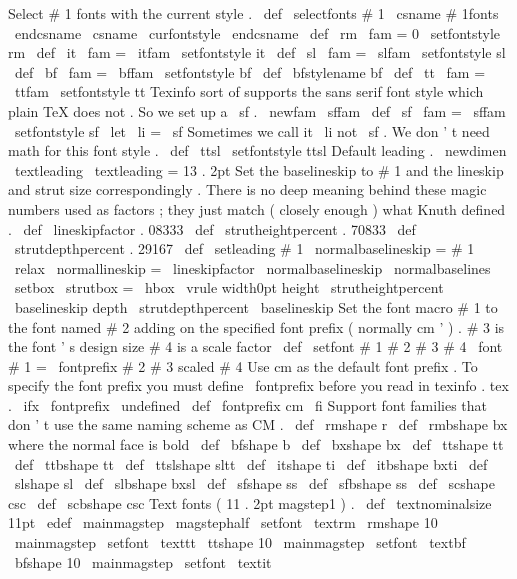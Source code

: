 %
Select
#
1
fonts
with
the
current
style
.
%
\
def
\
selectfonts
#
1
{
\
csname
#
1fonts
\
endcsname
\
csname
\
curfontstyle
\
endcsname
}
\
def
\
rm
{
\
fam
=
0
\
setfontstyle
{
rm
}
}
\
def
\
it
{
\
fam
=
\
itfam
\
setfontstyle
{
it
}
}
\
def
\
sl
{
\
fam
=
\
slfam
\
setfontstyle
{
sl
}
}
\
def
\
bf
{
\
fam
=
\
bffam
\
setfontstyle
{
bf
}
}
\
def
\
bfstylename
{
bf
}
\
def
\
tt
{
\
fam
=
\
ttfam
\
setfontstyle
{
tt
}
}
%
Texinfo
sort
of
supports
the
sans
serif
font
style
which
plain
TeX
does
not
.
%
So
we
set
up
a
\
sf
.
\
newfam
\
sffam
\
def
\
sf
{
\
fam
=
\
sffam
\
setfontstyle
{
sf
}
}
\
let
\
li
=
\
sf
%
Sometimes
we
call
it
\
li
not
\
sf
.
%
We
don
'
t
need
math
for
this
font
style
.
\
def
\
ttsl
{
\
setfontstyle
{
ttsl
}
}
%
Default
leading
.
\
newdimen
\
textleading
\
textleading
=
13
.
2pt
%
Set
the
baselineskip
to
#
1
and
the
lineskip
and
strut
size
%
correspondingly
.
There
is
no
deep
meaning
behind
these
magic
numbers
%
used
as
factors
;
they
just
match
(
closely
enough
)
what
Knuth
defined
.
%
\
def
\
lineskipfactor
{
.
08333
}
\
def
\
strutheightpercent
{
.
70833
}
\
def
\
strutdepthpercent
{
.
29167
}
%
\
def
\
setleading
#
1
{
%
\
normalbaselineskip
=
#
1
\
relax
\
normallineskip
=
\
lineskipfactor
\
normalbaselineskip
\
normalbaselines
\
setbox
\
strutbox
=
\
hbox
{
%
\
vrule
width0pt
height
\
strutheightpercent
\
baselineskip
depth
\
strutdepthpercent
\
baselineskip
}
%
}
%
Set
the
font
macro
#
1
to
the
font
named
#
2
adding
on
the
%
specified
font
prefix
(
normally
cm
'
)
.
%
#
3
is
the
font
'
s
design
size
#
4
is
a
scale
factor
\
def
\
setfont
#
1
#
2
#
3
#
4
{
\
font
#
1
=
\
fontprefix
#
2
#
3
scaled
#
4
}
%
Use
cm
as
the
default
font
prefix
.
%
To
specify
the
font
prefix
you
must
define
\
fontprefix
%
before
you
read
in
texinfo
.
tex
.
\
ifx
\
fontprefix
\
undefined
\
def
\
fontprefix
{
cm
}
\
fi
%
Support
font
families
that
don
'
t
use
the
same
naming
scheme
as
CM
.
\
def
\
rmshape
{
r
}
\
def
\
rmbshape
{
bx
}
%
where
the
normal
face
is
bold
\
def
\
bfshape
{
b
}
\
def
\
bxshape
{
bx
}
\
def
\
ttshape
{
tt
}
\
def
\
ttbshape
{
tt
}
\
def
\
ttslshape
{
sltt
}
\
def
\
itshape
{
ti
}
\
def
\
itbshape
{
bxti
}
\
def
\
slshape
{
sl
}
\
def
\
slbshape
{
bxsl
}
\
def
\
sfshape
{
ss
}
\
def
\
sfbshape
{
ss
}
\
def
\
scshape
{
csc
}
\
def
\
scbshape
{
csc
}
%
Text
fonts
(
11
.
2pt
magstep1
)
.
\
def
\
textnominalsize
{
11pt
}
\
edef
\
mainmagstep
{
\
magstephalf
}
\
setfont
\
textrm
\
rmshape
{
10
}
{
\
mainmagstep
}
\
setfont
\
texttt
\
ttshape
{
10
}
{
\
mainmagstep
}
\
setfont
\
textbf
\
bfshape
{
10
}
{
\
mainmagstep
}
\
setfont
\
textit
